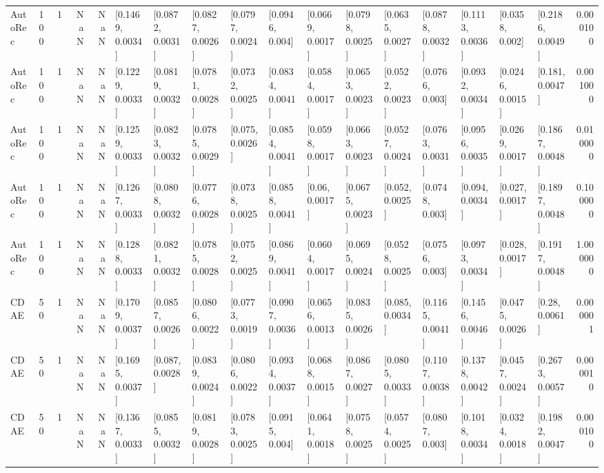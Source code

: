 \begin{tabular}{lllrrllllllllllllr}
 AutoRec &  100 &     1 &   NaN &   NaN &  [0.1469, 0.0034] &  [0.0872, 0.0031] &  [0.0827, 0.0026] &  [0.0797, 0.0024] &   [0.0946, 0.004] &  [0.0669, 0.0017] &  [0.0798, 0.0025] &  [0.0635, 0.0027] &  [0.0878, 0.0032] &  [0.1113, 0.0036] &   [0.0358, 0.002] &  [0.2186, 0.0049] &  0.000100 \\
 AutoRec &  100 &     1 &   NaN &   NaN &  [0.1229, 0.0033] &  [0.0819, 0.0032] &  [0.0781, 0.0028] &  [0.0732, 0.0025] &  [0.0834, 0.0041] &  [0.0584, 0.0017] &  [0.0653, 0.0023] &  [0.0522, 0.0023] &   [0.0766, 0.003] &  [0.0932, 0.0034] &  [0.0246, 0.0015] &   [0.181, 0.0047] &  0.001000 \\
 AutoRec &  100 &     1 &   NaN &   NaN &  [0.1259, 0.0033] &  [0.0823, 0.0032] &  [0.0785, 0.0029] &   [0.075, 0.0026] &  [0.0854, 0.0041] &  [0.0598, 0.0017] &  [0.0663, 0.0023] &  [0.0527, 0.0024] &  [0.0763, 0.0031] &  [0.0956, 0.0035] &  [0.0269, 0.0017] &  [0.1867, 0.0048] &  0.010000 \\
 AutoRec &  100 &     1 &   NaN &   NaN &  [0.1267, 0.0033] &  [0.0808, 0.0032] &  [0.0776, 0.0028] &  [0.0738, 0.0025] &  [0.0858, 0.0041] &    [0.06, 0.0017] &  [0.0675, 0.0023] &   [0.052, 0.0025] &   [0.0748, 0.003] &   [0.094, 0.0034] &   [0.027, 0.0017] &  [0.1897, 0.0048] &  0.100000 \\
 AutoRec &  100 &     1 &   NaN &   NaN &  [0.1288, 0.0033] &  [0.0821, 0.0032] &  [0.0785, 0.0028] &  [0.0752, 0.0025] &  [0.0869, 0.0041] &  [0.0604, 0.0017] &  [0.0695, 0.0024] &  [0.0528, 0.0025] &   [0.0756, 0.003] &  [0.0973, 0.0034] &   [0.028, 0.0017] &  [0.1917, 0.0048] &  1.000000 \\
    CDAE &   50 &     1 &   NaN &   NaN &  [0.1709, 0.0037] &  [0.0857, 0.0026] &  [0.0806, 0.0022] &  [0.0773, 0.0019] &  [0.0907, 0.0036] &  [0.0656, 0.0013] &  [0.0835, 0.0026] &   [0.085, 0.0034] &  [0.1165, 0.0041] &  [0.1456, 0.0046] &  [0.0475, 0.0026] &    [0.28, 0.0061] &  0.000001 \\
    CDAE &   50 &     1 &   NaN &   NaN &  [0.1695, 0.0037] &   [0.087, 0.0028] &  [0.0839, 0.0024] &  [0.0806, 0.0022] &  [0.0934, 0.0037] &  [0.0688, 0.0015] &  [0.0867, 0.0027] &  [0.0805, 0.0033] &  [0.1107, 0.0038] &  [0.1378, 0.0042] &  [0.0457, 0.0024] &  [0.2673, 0.0057] &  0.000010 \\
    CDAE &   50 &     1 &   NaN &   NaN &  [0.1367, 0.0033] &  [0.0855, 0.0032] &  [0.0819, 0.0028] &  [0.0783, 0.0025] &   [0.0915, 0.004] &  [0.0641, 0.0018] &  [0.0758, 0.0025] &  [0.0574, 0.0025] &   [0.0807, 0.003] &  [0.1018, 0.0034] &  [0.0324, 0.0018] &  [0.1982, 0.0047] &  0.000100 \\

\end{tabular}
